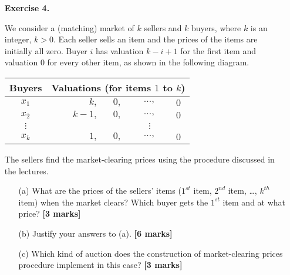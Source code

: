 \documentclass{article}
\begin{document}
\begin{enumerate}
	\item[\textbf{Exercise 4.}]  %

	      We consider a (matching) market of $k$ sellers and $k$ buyers, where $k$ is an integer, $k>0$.
	      Each seller sells an item and the prices of the items are initially all zero. Buyer $i$ has valuation $k-i+1$ for the first item and valuation $0$ for every other item, as shown in the following diagram.

	      \vspace*{0.5cm}
	      \begin{tabular}{c r c c c}
		      Buyers   & \multicolumn{4}{c}{Valuations (for items $1$ to $k$)}                          \\
		      \hline
		      $x_1$    & $k,$                                                  & $0,$ & $\ldots,$ & $0$ \\
		      $x_2$    & $k-1,$                                                & $0,$ & $\ldots,$ & $0$ \\
		      $\vdots$ &                                                       &      & $\vdots$        \\
		      $x_k$    & $1,$                                                  & $0,$ & $\ldots,$ & $0$ \\
	      \end{tabular}

	      \noindent The sellers find the market-clearing prices using the procedure discussed in the lectures.
	      \begin{enumerate}
		      \item[(a)] What are the prices of the sellers' items ($1^{st}$ item, $2^{nd}$ item, \ldots, $k^{th}$ item) when the market clears? Which buyer gets the $1^{st}$ item and at what price?  \hfill{\bf [3 marks]}\smallskip
		      \item[(b)] Justify your answers to (a).  \hfill{\bf [6 marks]}\smallskip
		      \item[(c)] Which kind of auction does the construction of market-clearing prices procedure implement in this case?  \hfill{\bf [3 marks]}\smallskip
	      \end{enumerate}

\end{enumerate}
\end{document}
